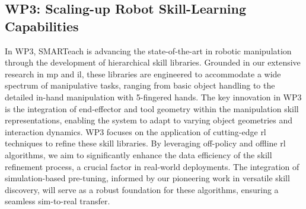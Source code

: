 \documentclass{erc-B2}
\begin{document}

\subsection{WP3: Scaling-up Robot Skill-Learning Capabilities}

In WP3, SMARTeach is advancing the state-of-the-art in robotic manipulation through the development of hierarchical skill libraries. Grounded in our extensive research in \gls*{mp} and \gls*{il}, these libraries are engineered to accommodate a wide spectrum of manipulative tasks, ranging from basic object handling to the detailed in-hand manipulation with 5-fingered hands. The key innovation in WP3 is the integration of end-effector and tool geometry within the manipulation skill representations, enabling the system to adapt to varying object geometries and interaction dynamics.
WP3 focuses on the application of cutting-edge \gls*{rl} techniques to refine these skill libraries. By leveraging off-policy and offline \gls*{rl} algorithms, we aim to significantly enhance the data efficiency of the skill refinement process, a crucial factor in real-world deployments. The integration of simulation-based pre-tuning, informed by our pioneering work in versatile skill discovery, will serve as a robust foundation for these algorithms, ensuring a seamless sim-to-real transfer.
\end{document}

